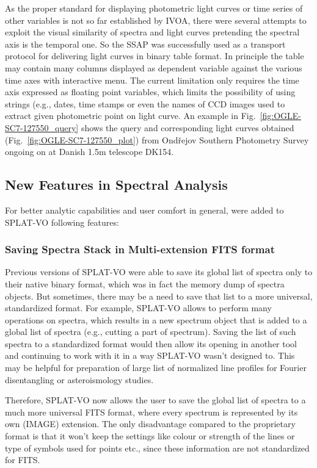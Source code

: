 \documentclass[final,authoryear,5p,times,twocolumn]{elsarticle}
\begin{document}
As the proper standard for displaying photometric light curves or time series
of other variables is not so far established by IVOA, there were several
attempts to exploit the visual similarity of spectra and light curves
pretending the spectral axis is the temporal one.  So the SSAP was
successfully used as a transport protocol for delivering light curves in
binary table format. In principle the table may contain many columns displayed
as dependent variable against the various time axes with interactive menu.
The current limitation only requires the time axis expressed as floating point
variables, which limits the possibility of using strings (e.g., dates, time
stamps or even the names of CCD images used to extract given photometric point
on light curve.  An example in Fig.~\ref{fig:OGLE-SC7-127550_query} shows the
query and corresponding light curves obtained  (Fig.~\ref{fig:OGLE-SC7-127550_plot})  from
Ond\v{r}ejov Southern Photometry Survey \citep{skoda_adassxxiii} ongoing on
at Danish 1.5m telescope DK154.

\subsection{New Features in Spectral Analysis}

\label{davids_functions}
For better analytic capabilities and user comfort in
general, were added \citep{and146bcthesis} to SPLAT-VO following features:

\subsubsection{Saving Spectra Stack in Multi-extension FITS format}

Previous versions of SPLAT-VO were able to save its global list of spectra only to
their native binary format, which was in fact the memory dump of spectra
objects. But sometimes, there may be a need to save that list to a more
universal, standardized format. For example, SPLAT-VO allows to perform many
operations on spectra, which results in a new spectrum object that is added to
a global list of spectra (e.g., cutting a part of spectrum). Saving the list of
such spectra to a standardized format would then allow its opening in another
tool and continuing to work with it in a way SPLAT-VO wasn't designed to.
This may be helpful for preparation of large list of normalized line profiles
for Fourier disentangling or asteroismology studies.

Therefore, SPLAT-VO now allows the user to save the global list of spectra to a
much more universal FITS format, where every spectrum  is represented by its
own (IMAGE) extension.  The only disadvantage compared to the proprietary
format is that it won't keep the settings like colour or strength of the lines
or type of symbols used for points etc., since these information  are not
standardized for FITS.
\end{document}
